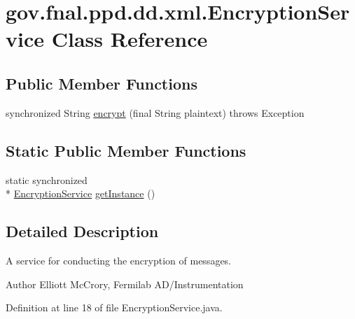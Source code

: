 \hypertarget{classgov_1_1fnal_1_1ppd_1_1dd_1_1xml_1_1EncryptionService}{\section{gov.\-fnal.\-ppd.\-dd.\-xml.\-Encryption\-Service Class Reference}
\label{classgov_1_1fnal_1_1ppd_1_1dd_1_1xml_1_1EncryptionService}
}
\subsection*{Public Member Functions}
\begin{DoxyCompactItemize}
\item 
synchronized String \hyperlink{classgov_1_1fnal_1_1ppd_1_1dd_1_1xml_1_1EncryptionService_acc22895b4cdbfad7241cb9aef7e44386}{encrypt} (final String plaintext)  throws Exception 
\end{DoxyCompactItemize}
\subsection*{Static Public Member Functions}
\begin{DoxyCompactItemize}
\item 
static synchronized \\*
\hyperlink{classgov_1_1fnal_1_1ppd_1_1dd_1_1xml_1_1EncryptionService}{Encryption\-Service} \hyperlink{classgov_1_1fnal_1_1ppd_1_1dd_1_1xml_1_1EncryptionService_af86ad51ad97df1cb699364bb83322da5}{get\-Instance} ()
\end{DoxyCompactItemize}


\subsection{Detailed Description}
A service for conducting the encryption of messages.

\begin{DoxyAuthor}{Author}
Elliott Mc\-Crory, Fermilab A\-D/\-Instrumentation 
\end{DoxyAuthor}


Definition at line 18 of file Encryption\-Service.\-java.




